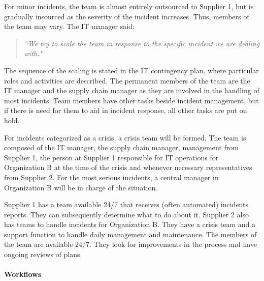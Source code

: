 For minor incidents, the team is almost entirely outsourced to Supplier 1, but is gradually insourced as the severity of the incident increases. Thus, members of the team may vary. The IT manager said:

\begin{quote}
\textit{``We try to scale the team in response to the specific incident we are dealing with."}
\end{quote}

The sequence of the scaling is stated in the IT contingency plan, where particular roles and activities are described. The permanent members of the team are the IT manager and the supply chain manager as they are involved in the handling of most incidents. Team members have other tasks beside incident management, but if there is need for them to aid in incident response, all other tasks are put on hold.

For incidents categorized as a crisis, a crisis team will be formed. The team is composed of the IT manager, the supply chain manager, management from Supplier 1, the person at Supplier 1 responsible for IT operations for Organization B at the time of the crisis and whenever necessary representatives from Supplier 2. For the most serious incidents, a central manager in Organization B will be in charge of the situation.

Supplier 1 has a team available 24/7 that receives (often automated) incidents reports. They can subsequently determine what to do about it. Supplier 2 also has teams to handle incidents for Organization B. They have a crisis team and a support function to handle daily management and maintenance. The members of the team are available 24/7. They look for improvements in the process and have ongoing reviews of plans. 

\paragraph{Workflows}

